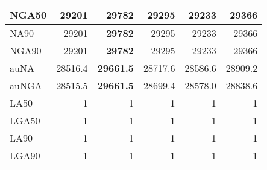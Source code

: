 \documentclass[12pt,a4paper]{article}
\begin{document}
\begin{table}[ht]
\begin{center}
\begin{tabular}{|l*{5}{|r}|}
NGA50 & 29201 & {\bf 29782} & 29295 & 29233 & 29366 \\ \hline
NA90 & 29201 & {\bf 29782} & 29295 & 29233 & 29366 \\ \hline
NGA90 & 29201 & {\bf 29782} & 29295 & 29233 & 29366 \\ \hline
auNA & 28516.4 & {\bf 29661.5} & 28717.6 & 28586.6 & 28909.2 \\ \hline
auNGA & 28515.5 & {\bf 29661.5} & 28699.4 & 28578.0 & 28838.6 \\ \hline
LA50 & 1 & 1 & 1 & 1 & 1 \\ \hline
LGA50 & 1 & 1 & 1 & 1 & 1 \\ \hline
LA90 & 1 & 1 & 1 & 1 & 1 \\ \hline
LGA90 & 1 & 1 & 1 & 1 & 1 \\ \hline
\end{tabular}
\end{center}
\end{table}
\end{document}
